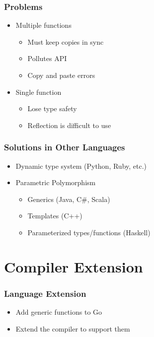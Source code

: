 \documentclass[12pt]{beamer}
\begin{document}

\begin{frame}[fragile]
\frametitle{Problems}
\begin{itemize}
\item Multiple functions
  \begin{itemize}
  \item Must keep copies in sync
  \item Pollutes API
  \item Copy and paste errors
  \end{itemize}
\item Single function
  \begin{itemize}
  \item Lose type safety
  \item Reflection is difficult to use
  \end{itemize}
\end{itemize}
\end{frame}


\begin{frame}[fragile]
\frametitle{Solutions in Other Languages}
\begin{itemize}
\item Dynamic type system (Python, Ruby, etc.)
\item Parametric Polymorphism
  \begin{itemize}
  \item Generics (Java, C\#, Scala)
  \item Templates (C++)
  \item Parameterized types/functions (Haskell)
  \end{itemize}
\end{itemize}
\end{frame}

\section{Compiler Extension}

\begin{frame}[fragile]
\frametitle{Language Extension}
\begin{itemize}
\item Add generic functions to Go
\item Extend the compiler to support them
\end{itemize}
\end{frame}
\end{document}
